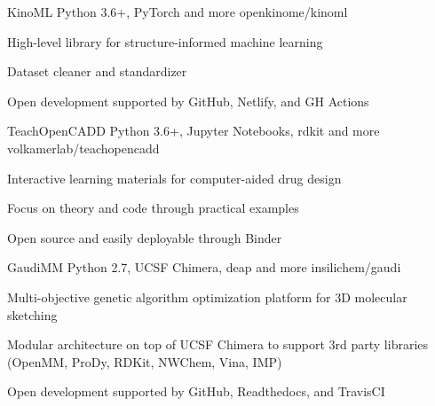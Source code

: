 \newpage


\begin{cventries}

  \projectentry
    {KinoML} %
    {Python 3.6+, PyTorch and more} %
    {} %
    {openkinome/kinoml} %
    {
      \begin{cvitems} %
        \item {High-level library for structure-informed machine learning}
        \item {Dataset cleaner and standardizer}
        \item {Open development supported by GitHub, Netlify, and GH Actions}
      \end{cvitems}
    }

  \projectentry
    {TeachOpenCADD} %
    {Python 3.6+, Jupyter Notebooks, rdkit and more} %
    {} %
    {volkamerlab/teachopencadd} %
    {
      \begin{cvitems} %
        \item {Interactive learning materials for computer-aided drug design}
        \item {Focus on theory and code through practical examples}
        \item {Open source and easily deployable through Binder}
      \end{cvitems}
    }

  \projectentry
    {GaudiMM} %
    {Python 2.7, UCSF Chimera, deap and more} %
    {} %
    {insilichem/gaudi} %
    {
      \begin{cvitems} %
        \item {Multi-objective genetic algorithm optimization platform for 3D molecular sketching}
        \item {Modular architecture on top of UCSF Chimera to support 3rd party libraries (OpenMM, ProDy, RDKit, NWChem, Vina, IMP)}
        \item {Open development supported by GitHub, Readthedocs, and TravisCI}
      \end{cvitems}
    }


\end{cventries}
